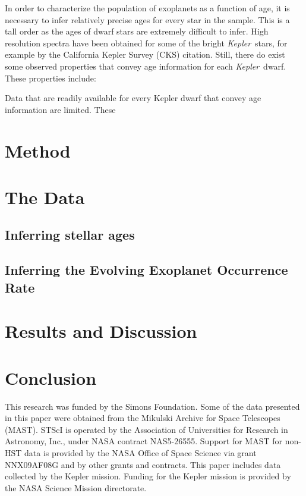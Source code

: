 \documentclass{aastex62}
\newcommand{\Kepler}{{\it Kepler}}
\newcommand{\kepler}{\Kepler}
\newcommand{\racomment}[1]{{\color{blue}#1}}
\begin{document}
In order to characterize the population of exoplanets as a function of age,
it is necessary to infer relatively precise ages for every star in the sample.
This is a tall order as the ages of dwarf stars are extremely difficult to
infer.
High resolution spectra have been obtained for some of the bright \kepler\
stars, for example by the California Kepler Survey (CKS) \racomment{citation}.
Still, there do exist some observed properties that convey age information for
each \Kepler\ dwarf.
These properties include:

Data that are readily available for every Kepler dwarf that convey age
information are limited.
These

\section{Method}
\label{sec:method}
\section{The Data}
\label{sec:data}
\subsection{Inferring stellar ages}
\label{sec:stellar_ages}
\subsection{Inferring the Evolving Exoplanet Occurrence Rate}

\section{Results and Discussion}
\label{sec:discussion}

\section{Conclusion}
\label{sec:conclusion}

This research was funded by the Simons Foundation.
Some of the data presented in this paper were obtained from the Mikulski
Archive for Space Telescopes (MAST).
STScI is operated by the Association of Universities for Research in
Astronomy, Inc., under NASA contract NAS5-26555.
Support for MAST for non-HST data is provided by the NASA Office of Space
Science via grant NNX09AF08G and by other grants and contracts.
This paper includes data collected by the Kepler mission. Funding for the
Kepler mission is provided by the NASA Science Mission directorate.

\begin{thebibliography}{} 
\end{thebibliography}
\end{document}
